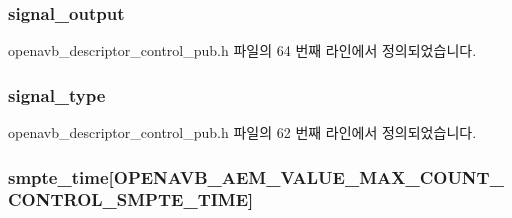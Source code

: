 \subsubsection[{\texorpdfstring{signal\+\_\+output}{signal_output}}]{ signal\+\_\+output}\hypertarget{structopenavb__aem__descriptor__control__t_a6a464d21574d97691ea70c2037ff8f6f}{}\label{structopenavb__aem__descriptor__control__t_a6a464d21574d97691ea70c2037ff8f6f}


openavb\+\_\+descriptor\+\_\+control\+\_\+pub.\+h 파일의 64 번째 라인에서 정의되었습니다.

\subsubsection[{\texorpdfstring{signal\+\_\+type}{signal_type}}]{ signal\+\_\+type}\hypertarget{structopenavb__aem__descriptor__control__t_a51ba5fdff9933eb274b46b67185d1c7b}{}\label{structopenavb__aem__descriptor__control__t_a51ba5fdff9933eb274b46b67185d1c7b}


openavb\+\_\+descriptor\+\_\+control\+\_\+pub.\+h 파일의 62 번째 라인에서 정의되었습니다.

\subsubsection[{\texorpdfstring{smpte\+\_\+time}{smpte_time}}]{ smpte\+\_\+time\mbox{[}{\bf O\+P\+E\+N\+A\+V\+B\+\_\+\+A\+E\+M\+\_\+\+V\+A\+L\+U\+E\+\_\+\+M\+A\+X\+\_\+\+C\+O\+U\+N\+T\+\_\+\+C\+O\+N\+T\+R\+O\+L\+\_\+\+S\+M\+P\+T\+E\+\_\+\+T\+I\+ME}\mbox{]}}\hypertarget{structopenavb__aem__descriptor__control__t_a9893199508fe8b0bb03b503c4900b431}{}\label{structopenavb__aem__descriptor__control__t_a9893199508fe8b0bb03b503c4900b431}


